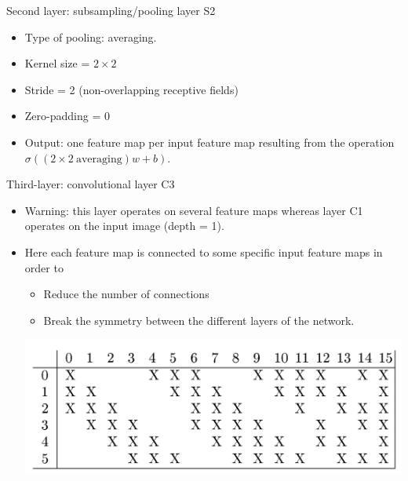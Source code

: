 \begin{frame}


Second layer: subsampling/pooling layer S2
\begin{itemize}
	\item Type of pooling: averaging.
	\item Kernel size = $2 \times 2$
	\item Stride = 2 (non-overlapping receptive fields)
	\item Zero-padding = 0
	\item Output: one feature map per input feature map resulting from the operation
	$\sigma ( (2 \times 2~ \textrm{averaging}) w + b).$
\end{itemize}

\bigskip

Third-layer: convolutional layer C3
\begin{itemize}
	\item Warning: this layer operates on several feature maps whereas layer C1 operates on the input image (depth = 1).
	\item Here each feature map is connected to some specific input feature maps in order to

	\begin{itemize}
		\item Reduce the number of connections
		\item Break the symmetry between the different layers of the network.
	\end{itemize}

\begin{center}
	\includegraphics[scale=0.3]{figs/Lenet_connections_third_layer}
\end{center}


\end{itemize}
\end{frame}

